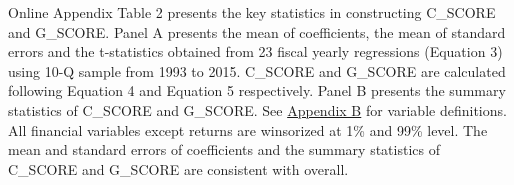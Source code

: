 \begin{table}[htbp]
\begin{footnotesize}
			\noindent Online Appendix Table 2 presents the key statistics in constructing C\_SCORE and G\_SCORE. Panel A presents the mean of coefficients, the mean of standard errors and the t-statistics obtained from 23 fiscal yearly regressions (Equation 3) using 10-Q sample from 1993 to 2015. C\_SCORE and G\_SCORE are calculated following Equation 4 and Equation 5 respectively. Panel B presents the summary statistics of C\_SCORE and G\_SCORE. See \hyperref[appb]{Appendix B} for variable definitions. All financial variables except returns are winsorized at 1\% and 99\% level. The mean and standard errors of coefficients and the summary statistics of C\_SCORE and G\_SCORE are consistent with  overall. 
		\end{footnotesize}
\end{table}%

